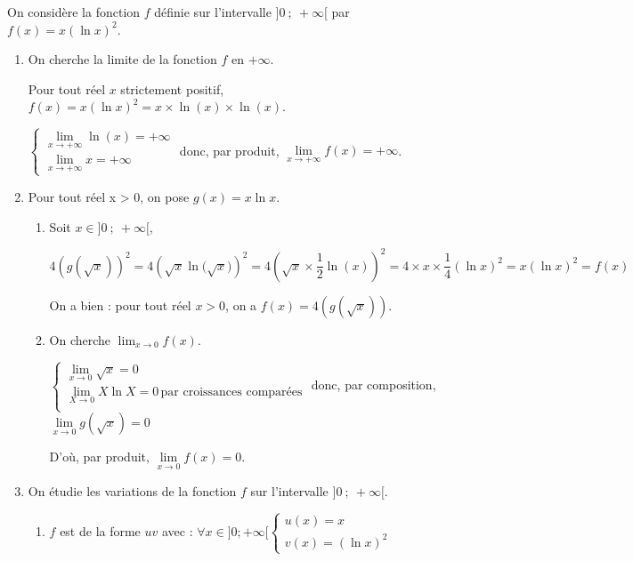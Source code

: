 On considère la fonction $f$ définie sur l'intervalle $]0~;~+\infty[$ par
$f(x) = x(\ln x)^2$.





\begin{enumerate}
	\item On cherche la limite de la fonction $f$ en $+\infty$.

	Pour tout réel $x$ strictement positif, $f(x)=x\left(\ln x\right)^2=x \times \ln(x) \times \ln(x)$. 
	
	$\begin{cases}
		\lim\limits_{x \to +\infty} \ln(x)= +\infty\\
		\lim\limits_{x\to +\infty}  x = +\infty
	\end{cases}$ donc, par produit,  $\lim\limits_{x \to +\infty} f(x)= +\infty$.
	
	\item Pour tout réel x > 0, on pose $g(x) = x\ln x$.
	\begin{enumerate}
		\item Soit $x \in ]0~;~+\infty[$, 

		$4\left(g\left(\sqrt x\right)\right) ^2= 4 \left( \sqrt{x} \ln\big(\sqrt{x}\big) \right) ^2= 4 \left( \sqrt{x} \times \dfrac{1}{2} \ln(x)\right)^2 = 4 \times x \times \dfrac{1}{4} \left( \ln x\right) ^2 = x \left( \ln x\right) ^2 =f(x)$

On a bien :  pour tout réel $x > 0$, on a $f(x) = 4\left(g\left(\sqrt x\right)\right)$.
		\item On cherche $\displaystyle\lim_{x \to 0} f(x)$.

$\begin{cases}
\lim\limits_{x \to 0} \sqrt{x} =0 \\
\lim\limits_{X \to 0} X\ln X = 0 \, \text{par croissances comparées} \\
\end{cases}$ donc, par composition, $\lim\limits_{x\to 0} g(\sqrt x)=0$

D'où, par produit, $\lim\limits_{x\to 0} f(x)=0$. 
	\end{enumerate}
\item On étudie les variations de la fonction $f$ sur l'intervalle $]0~;~+\infty[$.
	\begin{enumerate}
		\item $f$ est de la forme $uv$ avec : \quad $\forall x \in ]0;+\infty[  \begin{cases}
u(x)=x\\ v(x)=(\ln x)^2\end{cases}$


\end{enumerate}
\end{enumerate}
